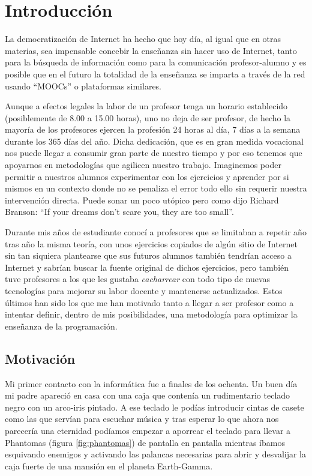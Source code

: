 \chapter{Introducción}

La democratización de Internet ha hecho que hoy día, al igual que en otras materias, sea impensable concebir la enseñanza sin hacer uso de Internet, tanto para la búsqueda de información como para la comunicación profesor-alumno y es posible que en el futuro la totalidad de la enseñanza se imparta a través de la red usando ``MOOCs'' o plataformas similares.

\bigskip
Aunque a efectos legales la labor de un profesor tenga un horario establecido (posiblemente de 8.00 a 15.00 horas), uno no deja de ser profesor, de hecho la mayoría de los profesores ejercen la profesión 24 horas al día, 7 días a la semana durante los 365 días del año. Dicha dedicación, que es en gran medida vocacional nos puede llegar a consumir gran parte de nuestro tiempo y por eso tenemos que apoyarnos en metodologías que agilicen nuestro trabajo. Imaginemos poder permitir a nuestros alumnos experimentar con los ejercicios y aprender por si mismos en un contexto donde no se penaliza el error todo ello sin requerir nuestra intervención directa. Puede sonar un poco utópico pero como dijo Richard Branson: ``If your dreams don’t scare you, they are too small''.

\bigskip
Durante mis años de estudiante conocí a profesores que se limitaban a repetir año tras año la misma teoría, con unos ejercicios copiados de algún sitio de Internet sin tan siquiera plantearse que sus futuros alumnos también tendrían acceso a Internet y sabrían buscar la fuente original de dichos ejercicios, pero también tuve profesores a los que les gustaba \textit{cacharrear} con todo tipo de nuevas tecnologías para mejorar su labor docente y mantenerse actualizados. Estos últimos han sido los que me han motivado tanto a llegar a ser profesor como a intentar definir, dentro de mis posibilidades, una metodología para optimizar la enseñanza de la programación.

\section{Motivación}

Mi primer contacto con la informática fue a finales de los ochenta. Un buen día mi padre apareció en casa con una caja que contenía un rudimentario teclado negro con un arco-iris pintado. A ese teclado le podías introducir cintas de casete como las que servían para escuchar música y tras esperar lo que ahora nos parecería una eternidad podíamos empezar a aporrear el teclado para llevar a Phantomas (figura \ref{fig:phantomas}) de pantalla en pantalla mientras íbamos esquivando enemigos y activando las palancas necesarias para abrir y desvalijar la caja fuerte de una mansión en el planeta Earth-Gamma.

